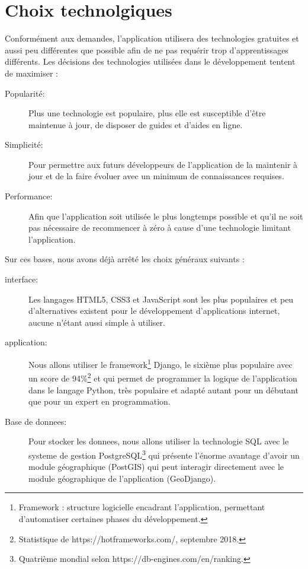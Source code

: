 \documentclass[a4paper, 11pt]{article}
\begin{document}
\section{Choix technolgiques}
  Conformément aux demandes, l'\gls{application} utilisera des technologies gratuites et aussi peu différentes que possible afin de ne pas requérir trop d'apprentissages différents. Les décisions des technologies utilisées dans le développement tentent de maximiser :
  \begin{description}
    \item[Popularité:] Plus une technologie est populaire, plus elle est susceptible d'être maintenue à jour, de disposer de guides et d'aides en ligne.
    \item[Simplicité:] Pour permettre aux futurs développeurs de l'\gls{application} de la maintenir à jour et de la faire évoluer avec un minimum de connaissances requises.
    \item[Performance:] Afin que l'\gls{application} soit utilisée le plus longtemps possible et qu'il ne soit pas nécessaire de recommencer à zéro à cause d'une technologie limitant l'\gls{application}.
  \end{description}

  Sur ces bases, nous avons déjà arrêté les choix généraux suivants :
  \begin{description}
    \item[\gls{interface}:] Les langages HTML5, CSS3 et JavaScript sont les plus populaires et peu d'alternatives existent pour le développement d'\gls{application}s internet, aucune n'étant aussi simple à utiliser.
    \item[\gls{application}:] Nous allons utiliser le framework\footnote{Framework : structure logicielle encadrant l'\gls{application}, permettant d'automatiser certaines phases du développement.} Django, le sixième plus populaire avec un score de 94\%\footnote{Statistique de https://hotframeworks.com/, septembre 2018.} et qui permet de programmer la logique de l'\gls{application} dans le langage Python, très populaire et adapté autant pour un débutant que pour un expert en programmation.
    \item[Base de \glspl{donnee}:] Pour stocker les \glspl{donnee}, nous allons utiliser la technologie SQL avec le \gls{systeme} de gestion PostgreSQL\footnote{Quatrième mondial selon https://db-engines.com/en/ranking.} qui présente l'énorme avantage d'avoir un module géographique (PostGIS) qui peut interagir directement avec le module géographique de l'\gls{application} (GeoDjango).
  \end{description}
\end{document}
